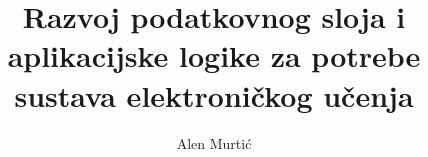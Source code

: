 \documentclass[times, utf8, zavrsni, numeric]{fer}
\begin{document}
	

\title{Razvoj podatkovnog sloja i aplikacijske logike za potrebe sustava elektroničkog učenja}

\author{Alen Murtić}

\maketitle

\izvornik

\zahvala{}

\tableofcontents
\end{document}
